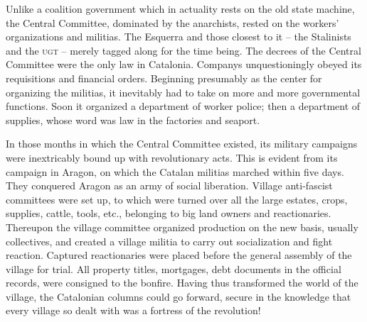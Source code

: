 Unlike a coalition government which in actuality rests on the old state machine, the Central Committee, dominated by the anarchists, rested on the workers’ organizations and militias. The Esquerra and those closest to it -- the Stalinists and the \textsc{ugt} -- merely tagged along for the time being. The decrees of the Central Committee were the only law in Catalonia. Companys unquestioningly obeyed its requisitions and financial orders. Beginning presumably as the center for organizing the militias, it inevitably had to take on more and more governmental functions. Soon it organized a department of worker police; then a department of supplies, whose word was law in the factories and seaport.

In those months in which the Central Committee existed, its military campaigns were inextricably bound up with revolutionary acts. This is evident from its campaign in Aragon, on which the Catalan militias marched within five days. They conquered Aragon as an army of social liberation. Village anti-fascist committees were set up, to which were turned over all the large estates, crops, supplies, cattle, tools, etc., belonging to big land owners and reactionaries. Thereupon the village committee organized production on the new basis, usually collectives, and created a village militia to carry out socialization and fight reaction. Captured reactionaries were placed before the general assembly of the village for trial. All property titles, mortgages, debt documents in the official records, were consigned to the bonfire. Having thus transformed the world of the village, the Catalonian columns could go forward, secure in the knowledge that every village so dealt with was a fortress of the revolution!

